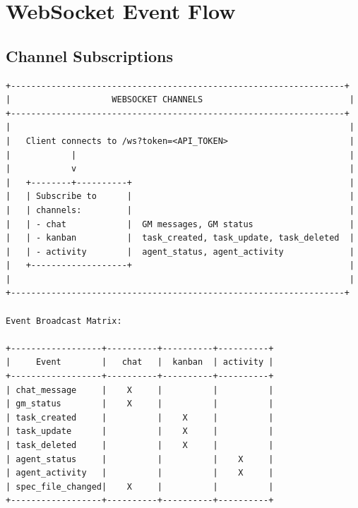 \documentclass[11pt,a4paper]{article}
\begin{document}
\section{WebSocket Event Flow}

\subsection{Channel Subscriptions}

\begin{verbatim}
+------------------------------------------------------------------+
|                    WEBSOCKET CHANNELS                             |
+------------------------------------------------------------------+
|                                                                   |
|   Client connects to /ws?token=<API_TOKEN>                        |
|            |                                                      |
|            v                                                      |
|   +--------+----------+                                           |
|   | Subscribe to      |                                           |
|   | channels:         |                                           |
|   | - chat            |  GM messages, GM status                   |
|   | - kanban          |  task_created, task_update, task_deleted  |
|   | - activity        |  agent_status, agent_activity             |
|   +-------------------+                                           |
|                                                                   |
+------------------------------------------------------------------+

Event Broadcast Matrix:

+------------------+----------+----------+----------+
|     Event        |   chat   |  kanban  | activity |
+------------------+----------+----------+----------+
| chat_message     |    X     |          |          |
| gm_status        |    X     |          |          |
| task_created     |          |    X     |          |
| task_update      |          |    X     |          |
| task_deleted     |          |    X     |          |
| agent_status     |          |          |    X     |
| agent_activity   |          |          |    X     |
| spec_file_changed|    X     |          |          |
+------------------+----------+----------+----------+
\end{verbatim}
\end{document}
